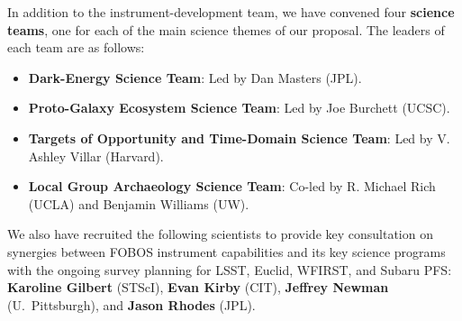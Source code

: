 \documentclass[oneside,11pt]{amsart}
\begin{document}
\noindent In addition to the instrument-development team, we have
convened four {\bf science teams}, one for each of the main science themes of
our proposal.  The leaders of each team are as follows:
%
\begin{itemize}
%
\item {\bf Dark-Energy Science Team}: Led by Dan Masters (JPL).\\[-5pt]
%
\item {\bf Proto-Galaxy Ecosystem Science Team}: Led by Joe Burchett
(UCSC).\\[-5pt]
%
\item {\bf Targets of Opportunity and Time-Domain Science Team}:
Led by V. Ashley Villar (Harvard).\\[-5pt]
%
\item {\bf Local Group Archaeology Science Team}: Co-led by R. Michael
Rich (UCLA) and Benjamin Williams (UW).
%
\end{itemize}

\noindent We also have recruited the following scientists to provide key
consultation on synergies between FOBOS instrument capabilities and its
key science programs with the ongoing survey planning for LSST, Euclid,
WFIRST, and Subaru PFS: {\bf Karoline Gilbert} (STScI), {\bf Evan Kirby}
(CIT), {\bf Jeffrey Newman} (U.\ Pittsburgh), and {\bf Jason Rhodes} (JPL).




\end{document}

